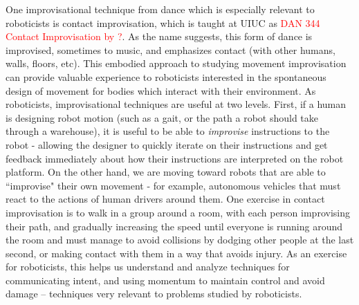\documentclass[arts,article,submit,moreauthors,pdftex,10pt,a4paper]{mdpi}
\begin{document}
One improvisational technique from dance which is especially relevant to roboticists is contact improvisation, which is taught at UIUC as \textcolor{red}{DAN 344 Contact Improvisation by ?}. As the name suggests, this form of dance is improvised, sometimes to music, and emphasizes contact (with other humans, walls, floors, etc). This embodied approach to studying movement improvisation can provide valuable experience to roboticists interested in the spontaneous design of movement for bodies which interact with their environment.
As roboticists, improvisational techniques are useful at two levels. First, if a human is designing robot motion (such as a gait, or the path a robot should take through a warehouse), it is useful to be able to \textit{improvise} instructions to the robot - allowing the designer to quickly iterate on their instructions and get
feedback immediately about how their instructions are interpreted on the robot platform. On the other hand, we are moving toward robots that are able to ``improvise" their own movement - for example, autonomous vehicles that must react to the actions of human drivers around them. One exercise in contact improvisation is to walk in a group around a room, with each person improvising their path, and gradually increasing the speed until everyone is running around the room and must manage to avoid collisions by dodging other people at the last second, or making contact with them in a way that avoids injury. As an exercise for roboticists, this helps us understand and analyze techniques for communicating intent, and using momentum to maintain control and avoid damage -- techniques very relevant to problems studied by roboticists.
\end{document}
